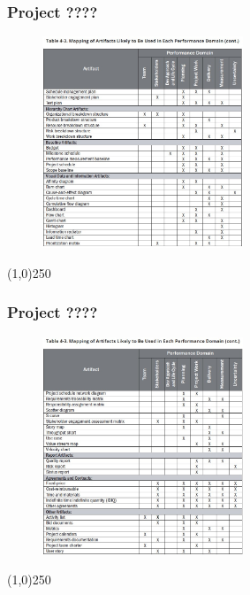 \begin{frame}
\frametitle{Project ????}
 \begin{figure}
    \centering
        \includegraphics[width = 6cm]{../images/guide/Table4-3b.jpg}
    \label{guideTable:4-3b}
 \end{figure}
\end{frame}
\begin{center}\line(1,0){250}\end{center}


\begin{frame}
\frametitle{Project ????}
 \begin{figure}
    \centering
        \includegraphics[width = 6cm]{../images/guide/Table4-3c.jpg}
    \label{guideTable:4-3c}
 \end{figure}
\end{frame}
\begin{center}\line(1,0){250}\end{center}





